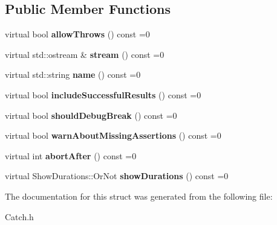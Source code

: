 \subsection*{Public Member Functions}
\begin{DoxyCompactItemize}
\item 
\hypertarget{struct_catch_1_1_i_config_aadb95f849359de1e6eb915aab063e542}{virtual bool {\bfseries allow\-Throws} () const =0}\label{struct_catch_1_1_i_config_aadb95f849359de1e6eb915aab063e542}

\item 
\hypertarget{struct_catch_1_1_i_config_aa4c3fe0825e7e6ebdcfa6abc7abf3617}{virtual std\-::ostream \& {\bfseries stream} () const =0}\label{struct_catch_1_1_i_config_aa4c3fe0825e7e6ebdcfa6abc7abf3617}

\item 
\hypertarget{struct_catch_1_1_i_config_aa2315800a05c19db71518b1edc39d43b}{virtual std\-::string {\bfseries name} () const =0}\label{struct_catch_1_1_i_config_aa2315800a05c19db71518b1edc39d43b}

\item 
\hypertarget{struct_catch_1_1_i_config_a2f1b0391019b9ce69921527a684eab23}{virtual bool {\bfseries include\-Successful\-Results} () const =0}\label{struct_catch_1_1_i_config_a2f1b0391019b9ce69921527a684eab23}

\item 
\hypertarget{struct_catch_1_1_i_config_a5b886c5aad9001e90f63a7cf0726af63}{virtual bool {\bfseries should\-Debug\-Break} () const =0}\label{struct_catch_1_1_i_config_a5b886c5aad9001e90f63a7cf0726af63}

\item 
\hypertarget{struct_catch_1_1_i_config_a75d970c495a28e46b8e9b04a1d32149f}{virtual bool {\bfseries warn\-About\-Missing\-Assertions} () const =0}\label{struct_catch_1_1_i_config_a75d970c495a28e46b8e9b04a1d32149f}

\item 
\hypertarget{struct_catch_1_1_i_config_a363f3388a439d02217f37198eff96744}{virtual int {\bfseries abort\-After} () const =0}\label{struct_catch_1_1_i_config_a363f3388a439d02217f37198eff96744}

\item 
\hypertarget{struct_catch_1_1_i_config_abaa97d281484278291f0d3db6d404aeb}{virtual Show\-Durations\-::\-Or\-Not {\bfseries show\-Durations} () const =0}\label{struct_catch_1_1_i_config_abaa97d281484278291f0d3db6d404aeb}

\end{DoxyCompactItemize}


The documentation for this struct was generated from the following file\-:\begin{DoxyCompactItemize}
\item 
Catch.\-h\end{DoxyCompactItemize}
